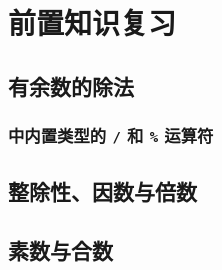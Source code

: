
\section{前置知识复习}
\frame{}%
\subsection{有余数的除法}
\begin{frame}[c]
  \progressnow*
\end{frame}
\frame{}%
\subsubsection{\Cpp{} 中内置类型的 \texttt{/} 和 \texttt{\%} 运算符}
\begin{frame}[c]
  \progressnow
\end{frame}
\frame{}%
\subsection{整除性、因数与倍数}
\begin{frame}[c]
  \progressnow*
\end{frame}
\frame{}%
\subsection{素数与合数}
\begin{frame}[c]
  \progressnow*
\end{frame}
\frame{}%
